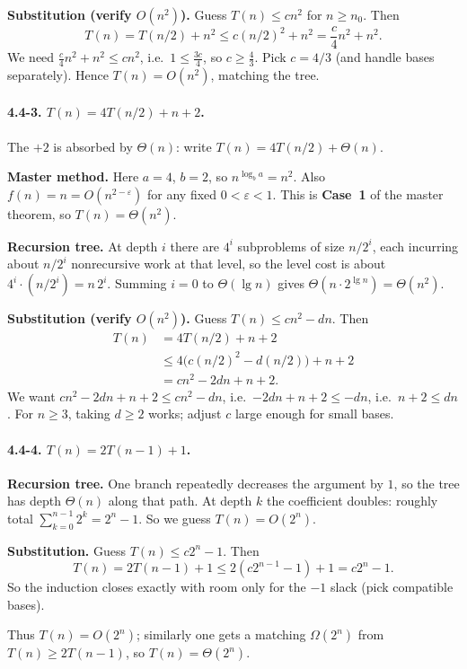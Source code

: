 \documentclass{article}
\theoremstyle{theorem}
\theoremstyle{definition}
\theoremstyle{remark}
\begin{document}
\textbf{Substitution (verify $O(n^2)$).} Guess $T(n)\le c n^2$ for $n\ge n_0$. Then
\[
T(n)=T(n/2)+n^2 \le c(n/2)^2+n^2 = \frac{c}{4}n^2+n^2.
\]
We need $\frac{c}{4}n^2+n^2\le c n^2$, i.e.\ $1\le \frac{3c}{4}$, so $c\ge \frac{4}{3}$. Pick $c=4/3$ (and handle bases separately). Hence $T(n)=O(n^2)$, matching the tree.

\paragraph{4.4-3. $T(n)=4T(n/2)+n+2$.}
The $+2$ is absorbed by $\Theta(n)$: write $T(n)=4T(n/2)+\Theta(n)$.

\textbf{Master method.} Here $a=4$, $b=2$, so $n^{\log_b a}=n^2$. Also $f(n)=n=O(n^{2-\varepsilon})$ for any fixed $0<\varepsilon<1$. This is \textbf{Case~1} of the master theorem, so $T(n)=\Theta(n^2)$.

\textbf{Recursion tree.} At depth $i$ there are $4^i$ subproblems of size $n/2^i$, each incurring about $n/2^i$ nonrecursive work at that level, so the level cost is about $4^i\cdot (n/2^i)=n\,2^i$. Summing $i=0$ to $\Theta(\lg n)$ gives $\Theta(n\cdot 2^{\lg n})=\Theta(n^2)$.

\textbf{Substitution (verify $O(n^2)$).} Guess $T(n)\le c n^2 - d n$. Then
\begin{align*}
T(n) &= 4T(n/2)+n+2 \\
&\le 4\bigl(c(n/2)^2-d(n/2)\bigr)+n+2 \\
&= c n^2 - 2d n + n + 2.
\end{align*}
We want $c n^2 - 2d n + n + 2 \le c n^2 - d n$, i.e.\ $-2d n+n+2\le -d n$, i.e.\ $n+2\le d n$. For $n\ge 3$, taking $d\ge 2$ works; adjust $c$ large enough for small bases.

\paragraph{4.4-4. $T(n)=2T(n-1)+1$.}
\textbf{Recursion tree.} One branch repeatedly decreases the argument by $1$, so the tree has depth $\Theta(n)$ along that path. At depth $k$ the coefficient doubles: roughly total $\sum_{k=0}^{n-1} 2^k = 2^n-1$. So we guess $T(n)=O(2^n)$.

\textbf{Substitution.} Guess $T(n)\le c 2^n - 1$. Then
\[
T(n)=2T(n-1)+1 \le 2(c 2^{n-1}-1)+1 = c 2^n -1.
\]
So the induction closes exactly with room only for the $-1$ slack (pick compatible bases).

Thus $T(n)=O(2^n)$; similarly one gets a matching $\Omega(2^n)$ from $T(n)\ge 2T(n-1)$, so $T(n)=\Theta(2^n)$.
\end{document}
